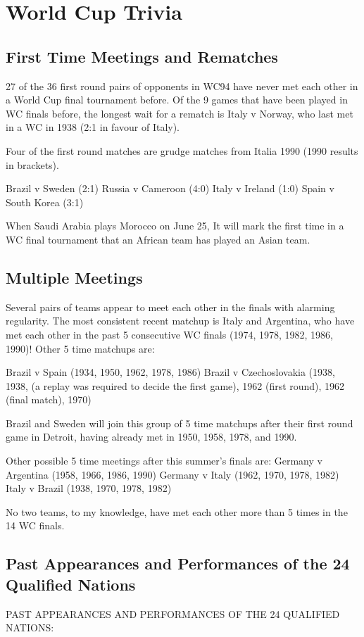 \chapter{World Cup Trivia}
\section{First Time Meetings and Rematches}

27 of the 36 first round pairs of opponents in WC94 have never met each other 
in a World Cup final tournament before. Of the 9 games that have been played 
in WC finals before, the longest wait for a rematch is Italy v Norway, who last
met in a WC in 1938 (2:1 in favour of Italy).

Four of the first round matches are grudge matches from Italia 1990 (1990 results in
brackets).

Brazil v Sweden (2:1)
Russia v Cameroon (4:0)
Italy v Ireland (1:0)
Spain v South Korea (3:1)

When Saudi Arabia plays Morocco on June 25, It will mark the first time in a WC
final tournament that an African team has played an Asian team.

\section{Multiple Meetings}

Several pairs of teams appear to meet each other in the finals with alarming 
regularity. The most consistent recent matchup is Italy and Argentina, who have
met each other in the past 5 consecutive WC finals (1974, 1978, 1982, 1986, 1990)! 
Other 5 time matchups are:

Brazil v Spain (1934, 1950, 1962, 1978, 1986)
Brazil v Czechoslovakia (1938, 1938, (a replay was required to decide the first game), 1962 (first round), 1962 (final match), 1970)

Brazil and Sweden will join this group of 5 time matchups after their first 
round game in Detroit, having already met in 1950, 1958, 1978, and 1990.

Other possible 5 time meetings after this summer's finals are:
Germany v Argentina (1958, 1966, 1986, 1990)
Germany v Italy (1962, 1970, 1978, 1982)
Italy v Brazil (1938, 1970, 1978, 1982)

No two teams, to my knowledge, have met each other more than 5 times in the 14
WC finals.

\section{Past Appearances and Performances of the 24 Qualified Nations}
PAST APPEARANCES AND PERFORMANCES OF THE 24 QUALIFIED NATIONS:

